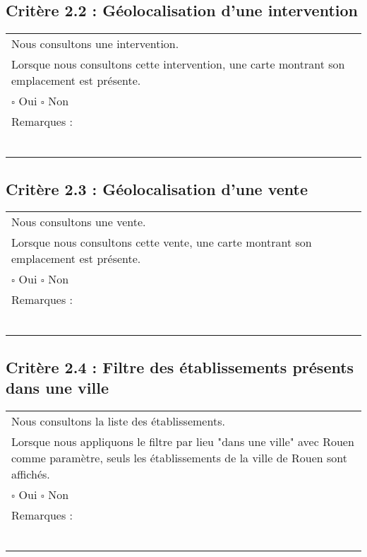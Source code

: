   	\subsection*{Critère 2.2 : Géolocalisation d'une intervention}
  		\begin{center}
    	 		\begin{tabular}[h]{|p{}|}
			\hline
				Nous consultons une intervention. \\
				Lorsque nous consultons cette intervention, une carte montrant son emplacement est présente. \\
						
				$\square$ Oui  \hfill \hfill $\square$ Non \\\hline Remarques : \\ ~\\
			 \\\hline
     		\end{tabular}
  		\end{center}	
  		
  	\subsection*{Critère 2.3 : Géolocalisation d'une vente}
  		\begin{center}
    	 		\begin{tabular}[h]{|p{}|}
			\hline
				Nous consultons une vente. \\
				Lorsque nous consultons cette vente, une carte montrant son emplacement est présente. \\
						
				$\square$ Oui  \hfill \hfill $\square$ Non \\\hline Remarques : \\ ~\\
			 \\\hline
     		\end{tabular}
  		\end{center}	
  		
  	\subsection*{Critère 2.4 : Filtre des établissements présents dans une ville}
  		\begin{center}
    	 		\begin{tabular}[h]{|p{}|}
			\hline
				Nous consultons la liste des établissements. \\
				Lorsque nous appliquons le filtre par lieu "dans une ville" avec Rouen comme paramètre, seuls les établissements de la ville de Rouen sont affichés. \\
						
				$\square$ Oui  \hfill \hfill $\square$ Non \\\hline Remarques : \\ ~\\
			 \\\hline
     		\end{tabular}
  		\end{center}	
  		

